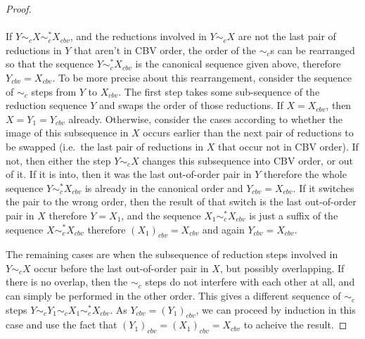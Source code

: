 \documentclass{article}
\theoremstyle{definition}
\theoremstyle{lemma}
\theoremstyle{remark}
\begin{document}
\begin{proof}
\paragraph{}
If $Y \sim_c X \sim_c^* X_{cbv}$, and the reductions involved in $Y \sim_c X$ are not the last pair of reductions in $Y$ that aren't in CBV order, the order of the $\sim_c$s can be rearranged so that the sequence $Y \sim_c^* X_{cbv}$ is the canonical sequence given above, therefore $Y_{cbv} = X_{cbv}$. To be more precise about this rearrangement, consider the sequence of $\sim_c$ steps from $Y$ to $X_{cbv}$. The first step takes some sub-sequence of the reduction sequence $Y$ and swaps the order of those reductions. If $X = X_{cbv}$, then $X = Y_1 = Y_{cbv}$ already. Otherwise, consider the cases according to whether the image of this subsequence in $X$ occurs earlier than the next pair of reductions to be swapped (i.e.~the last pair of reductions in $X$ that occur not in CBV order). If not, then either the step $Y \sim_c X$ changes this subsequence into CBV order, or out of it. If it is into, then it was the last out-of-order pair in $Y$ therefore the whole sequence $Y \sim_c^* X_{cbv}$ is already in the canonical order and $Y_{cbv} = X_{cbv}$. If it switches the pair to the wrong order, then the result of that switch is the last out-of-order pair in $X$ therefore $Y = X_1$, and the sequence $X_1 \sim_c^* X_{cbv}$ is just a suffix of the sequence $X \sim_c^* X_{cbv}$ therefore $(X_1)_{cbv} = X_{cbv}$ and again $Y_{cbv} = X_{cbv}$.

The remaining cases are when the subsequence of reduction steps involved in $Y \sim_c X$ occur before the last out-of-order pair in $X$, but possibly overlapping. If there is no overlap, then the $\sim_c$ steps do not interfere with each other at all, and can simply be performed in the other order. This gives a different sequence of $\sim_c$ steps $Y \sim_c Y_1 \sim_c X_1 \sim_c^* X_{cbv}$. As $Y_{cbv} = (Y_1)_{cbv}$, we can proceed by induction in this case and use the fact that $(Y_1)_{cbv} = (X_1)_{cbv} = X_{cbv}$ to acheive the result.


\end{proof}
\end{document}
